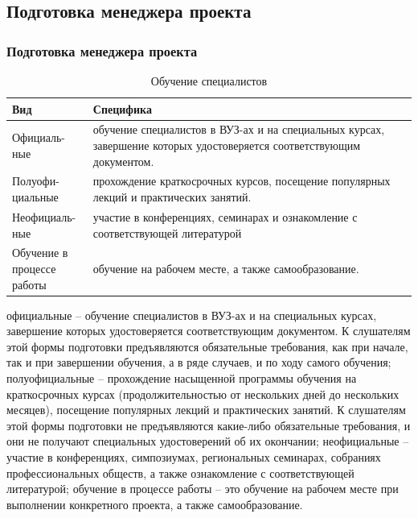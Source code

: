 \documentclass{../industrial-development}
\begin{document}
\subsection{Подготовка менеджера проекта}
\begin{frame} \frametitle{Подготовка менеджера проекта}

	 	\begin{table}[H]
\caption{\label{tab:canonsummary} Обучение специалистов}
\begin{center}
\begin{tabular}{|p{0.2\linewidth}|p{0.8\linewidth}|}
\hline
\textbf{Вид} & \textbf{Специфика} \\
\hline
Официаль-ные &  обучение специалистов в ВУЗ-ах и на специальных курсах, завершение которых удостоверяется соответствующим документом. \\
\hline
Полуофи-циальные  & прохождение краткосрочных курсов, посещение популярных лекций и практических занятий. \\
\hline
Неофициаль-ные &  участие в конференциях, семинарах и ознакомление с соответствующей литературой \\
\hline
Обучение в процессе работы & обучение на рабочем месте, а также самообразование. \\
\hline
\end{tabular}
\end{center}
\end{table} 
\end{frame}
\lecturenotes
официальные – обучение специалистов в ВУЗ-ах и на специальных курсах, завершение которых удостоверяется соответствующим документом. К слушателям этой формы подготовки предъявляются обязательные требования, как при начале, так и при завершении обучения, а в ряде случаев, и по ходу самого обучения;
полуофициальные – прохождение насыщенной программы обучения на краткосрочных курсах (продолжительностью от нескольких дней до нескольких месяцев), посещение популярных лекций и практических занятий. К слушателям этой формы подготовки не предъявляются какие-либо обязательные требования, и они не получают специальных удостоверений об их окончании;
неофициальные – участие в конференциях, симпозиумах, региональных семинарах, собраниях профессиональных обществ, а также ознакомление с соответствующей литературой;
обучение в процессе работы – это обучение на рабочем месте при выполнении конкретного проекта, а также самообразование.
~\cite{How_to_be_a_good_IT-manager}
\end{document}
